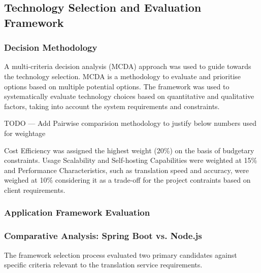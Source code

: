 \subsection{Technology Selection and Evaluation Framework}

\subsubsection{Decision Methodology}

A multi-criteria decision analysis (MCDA) approach was used to guide towards the technology selection\cite{mcda}. MCDA is a methodology to evaluate and prioritise options based on multiple potential options. The framework was used to systematically evaluate technology choices based on quantitative and qualitative factors, taking into account the system requirements and constraints.

TODO --- Add Pairwise comparision methodology to justify below numbers used for weightage

Cost Efficiency was assigned the highest weight (20\%) on the basis of budgetary constraints. Usage Scalability and Self-hosting Capabilities were weighted at 15\% and Performance Characteristics, such as translation speed and accuracy, were weighed at 10\% considering it as a trade-off for the project contraints based on client requirements.

\subsubsection{Application Framework Evaluation}

\subsubsection{Comparative Analysis: Spring Boot vs. Node.js}

The framework selection process evaluated two primary candidates against specific criteria relevant to the translation service requirements.

